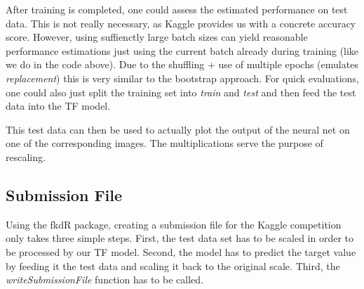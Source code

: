 \documentclass[]{article}
\newenvironment{Shaded}{\begin{snugshade}}{\end{snugshade}}
\newcommand{\KeywordTok}[1]{\textcolor[rgb]{0.13,0.29,0.53}{\textbf{{#1}}}}
\newcommand{\DataTypeTok}[1]{\textcolor[rgb]{0.13,0.29,0.53}{{#1}}}
\newcommand{\DecValTok}[1]{\textcolor[rgb]{0.00,0.00,0.81}{{#1}}}
\newcommand{\StringTok}[1]{\textcolor[rgb]{0.31,0.60,0.02}{{#1}}}
\newcommand{\NormalTok}[1]{{#1}}
\begin{document}
After training is completed, one could assess the estimated performance
on test data. This is not really necessary, as Kaggle provides us with a
concrete accuracy score. However, using suffienctly large batch sizes
can yield reasonable performance estimations just using the current
batch already during training (like we do in the code above). Due to the
shuffling + use of multiple epochs (emulates \emph{replacement}) this is
very similar to the bootstrap approach. For quick evaluations, one could
also just split the training set into \emph{train} and \emph{test} and
then feed the test data into the TF model.

\begin{Shaded}
\end{Shaded}

This test data can then be used to actually plot the output of the
neural net on one of the corresponding images. The multiplications serve
the purpose of rescaling.

\begin{Shaded}
\end{Shaded}

\subsection{Submission File}\label{submission-file}

Using the fkdR package, creating a submission file for the Kaggle
competition only takes three simple steps. First, the test data set has
to be scaled in order to be processed by our TF model. Second, the model
has to predict the target value by feeding it the test data and scaling
it back to the original scale. Third, the \emph{writeSubmissionFile}
function has to be called.
\end{document}
